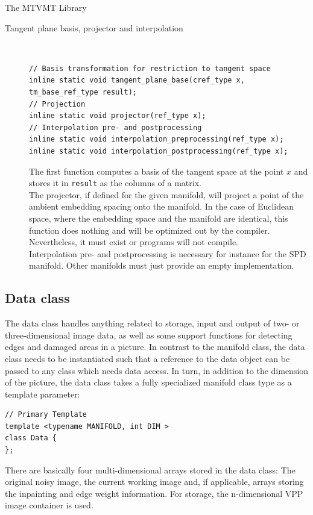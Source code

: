 \begin{chapter}{The MTVMT Library}
\begin{description}
    \item[Tangent plane basis, projector and interpolation] \hfill \\
	\cppinline
	\begin{lstlisting}
// Basis transformation for restriction to tangent space
inline static void tangent_plane_base(cref_type x, tm_base_ref_type result);
// Projection
inline static void projector(ref_type x);
// Interpolation pre- and postprocessing
inline static void interpolation_preprocessing(ref_type x);
inline static void interpolation_postprocessing(ref_type x);
	\end{lstlisting}

	The first function computes a basis of the tangent space at the point $x$ and stores it in \texttt{result} as the columns of a matrix.\\
	The projector, if defined for the given manifold, will project a point of the ambient embedding spacing onto the manifold. In the case of Euclidean space, where the 
	embedding space and the manifold are identical, this function does nothing and will be optimized out by the compiler. Nevertheless, it must exist or programs will not compile.\\
	Interpolation pre- and postprocessing is necessary for instance for the SPD manifold. Other manifolds must just provide an empty implementation.
\end{description}
\subsection{Data class} %
\label{sub:Data class}
The data class handles anything related to storage, input and output of two- or three-dimensional image data, as well as some support functions for detecting edges and damaged areas in a picture.
In contrast to the manifold class, the data class needs to be instantiated such that a reference to the data object can be passed to any class which needs data access. In turn, in addition
to the dimension of the picture, the data class takes a fully specialized manifold class type as a template parameter:

\cppinline
\begin{lstlisting}
// Primary Template
template <typename MANIFOLD, int DIM >
class Data {
};    
\end{lstlisting}

There are basically four multi-dimensional arrays stored in the data class: The original noisy image, the current working image and, if applicable, arrays storing the inpainting
and edge weight information. For storage, the n-dimensional VPP \cite{VPP} image container is used.\\


\end{chapter}

